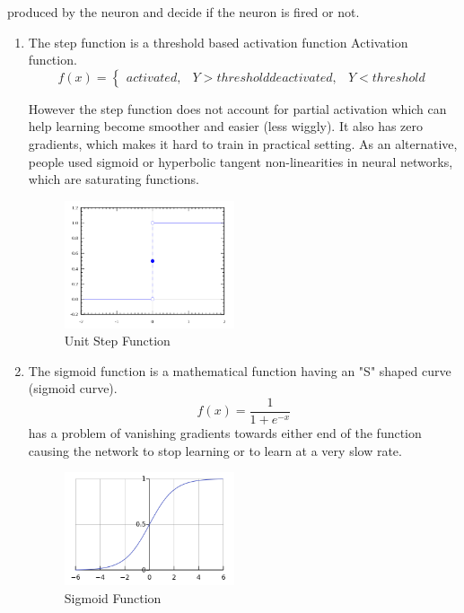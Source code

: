 produced by the neuron and decide if the neuron is fired or not. 
\begin{enumerate}[label=(\alph*)]
\item The step function is a threshold based activation function Activation function. 
\begin{equation}
    f(x)=\begin{cases}
            activated, & Y > threshold
            deactivated, & Y < threshold
        \end{cases}
\end{equation}

However the step function does not account for partial activation which can help learning become smoother and easier (less wiggly). It also has zero gradients, which makes it hard to train in practical setting. As an alternative, people used sigmoid or hyperbolic tangent non-linearities in neural networks, which are saturating functions. 
\begin{figure}[ht]
\centering
\includegraphics[width=50mm]{lectures/02-b/step_function.png}
\caption{Unit Step Function}
\label{fig:step_function}
\end{figure}

\item The sigmoid function is a mathematical function having an "S" shaped curve (sigmoid curve).
\begin{equation}
    f(x) = \frac{1}{1+e^{-x}}
\end{equation}
has a problem of vanishing gradients towards either end of the function causing the network to stop learning or to learn at a very slow rate.

\begin{figure}[ht]
\centering
\includegraphics[width=50mm]{lectures/02-b/sigmoid_function.png}
\caption{Sigmoid Function}
\label{fig:sigmoid}
\end{figure}


\end{enumerate}
